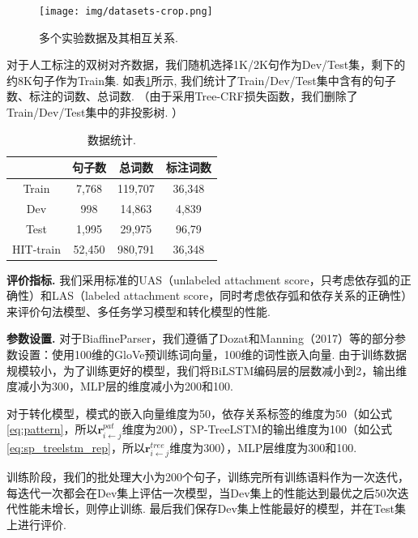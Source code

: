 \begin{figure}[hb!]
    \centering
    \texttt{[image: img/datasets-crop.png]}
    \caption{多个实验数据及其相互关系. }
    \label{fig:datasets}
\end{figure}

对于人工标注的双树对齐数据，我们随机选择1K/2K句作为Dev/Test集，剩下的约8K句子作为Train集. 如表\ref{tb:HIT-split}所示, 我们统计了Train/Dev/Test集中含有的句子数、标注的词数、总词数. %
（由于采用Tree-CRF损失函数，我们删除了Train/Dev/Test集中的非投影树. ）

\begin{table}[hb!]
    \centering
    \caption{数据统计. }
    \label{tb:HIT-split}
    \begin{tabular}{cccc}
        \toprule
                  & 句子数 & 总词数  & 标注词数 \\
        \midrule
        Train     & 7,768  & 119,707 & 36,348   \\ %
        Dev       & 998    & 14,863  & 4,839    \\ %
        Test      & 1,995  & 29,975  & 96,79    \\
        \midrule
        HIT-train & 52,450 & 980,791 & 36,348   \\
        \bottomrule
    \end{tabular}
\end{table}

\textbf{评价指标.  } 我们采用标准的UAS（unlabeled attachment score，只考虑依存弧的正确性）和LAS（labeled attachment score，同时考虑依存弧和依存关系的正确性）来评价句法模型、多任务学习模型和转化模型的性能.

\textbf{参数设置.  } 对于BiaffineParser，我们遵循了Dozat和Manning（2017）\cite{dozat2017deep}等的部分参数设置：使用100维的GloVe预训练词向量，100维的词性嵌入向量. 由于训练数据规模较小，为了训练更好的模型，我们将BiLSTM编码层的层数减小到2，输出维度减小为300，MLP层的维度减小为200和100.

对于转化模型，模式的嵌入向量维度为50，依存关系标签的维度为50（如公式\ref{eq:pattern}，所以$\mathbf{r}^{pat}_{i \leftarrow j}$维度为200），SP-TreeLSTM的输出维度为100（如公式\ref{eq:sp_treelstm_rep}，所以$\mathbf{r}^{tree}_{i \leftarrow j}$维度为300），MLP层维度为300和100.

训练阶段，我们的批处理大小为200个句子，训练完所有训练语料作为一次迭代，每迭代一次都会在Dev集上评估一次模型，当Dev集上的性能达到最优之后50次迭代性能未增长，则停止训练. 最后我们保存Dev集上性能最好的模型，并在Test集上进行评价.

